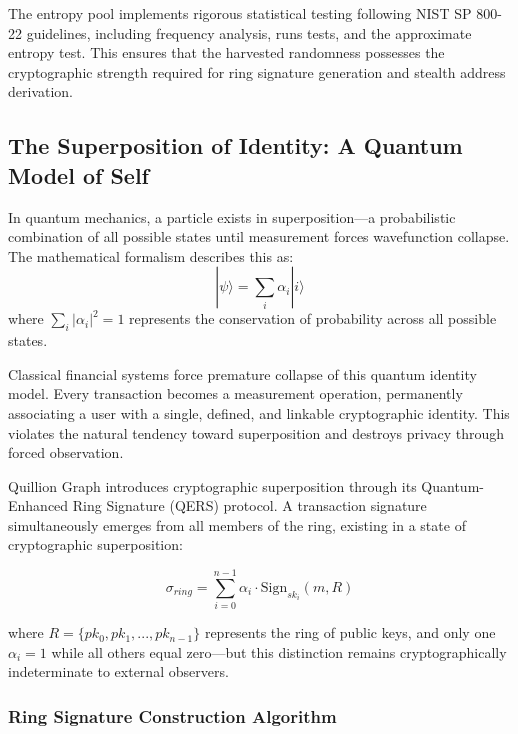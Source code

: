 \documentclass[11pt,a4paper]{article}
\begin{document}
The entropy pool implements rigorous statistical testing following NIST SP 800-22 guidelines, including frequency analysis, runs tests, and the approximate entropy test. This ensures that the harvested randomness possesses the cryptographic strength required for ring signature generation and stealth address derivation.

\subsection{The Superposition of Identity: A Quantum Model of Self}

In quantum mechanics, a particle exists in superposition—a probabilistic combination of all possible states until measurement forces wavefunction collapse. The mathematical formalism describes this as:
$$|\psi\rangle = \sum_{i} \alpha_i |i\rangle$$
where $\sum_{i} |\alpha_i|^2 = 1$ represents the conservation of probability across all possible states.

Classical financial systems force premature collapse of this quantum identity model. Every transaction becomes a measurement operation, permanently associating a user with a single, defined, and linkable cryptographic identity. This violates the natural tendency toward superposition and destroys privacy through forced observation.

Quillion Graph introduces cryptographic superposition through its Quantum-Enhanced Ring Signature (QERS) protocol. A transaction signature simultaneously emerges from all members of the ring, existing in a state of cryptographic superposition:

$$\sigma_{ring} = \sum_{i=0}^{n-1} \alpha_i \cdot \text{Sign}_{sk_i}(m, R)$$

where $R = \{pk_0, pk_1, ..., pk_{n-1}\}$ represents the ring of public keys, and only one $\alpha_i = 1$ while all others equal zero—but this distinction remains cryptographically indeterminate to external observers.

\subsubsection{Ring Signature Construction Algorithm}
\end{document}
